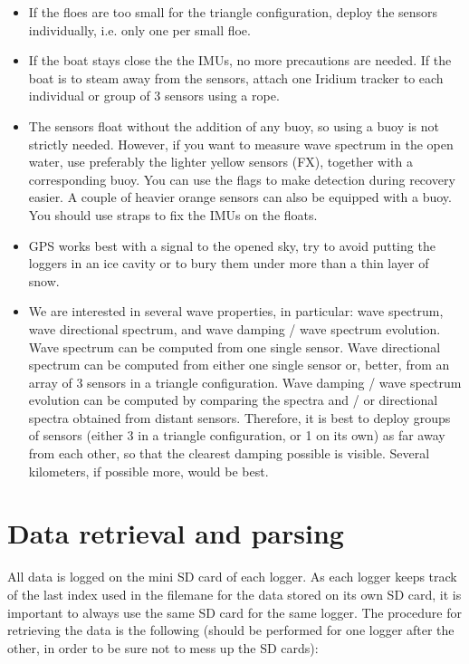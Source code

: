 \documentclass[pdftex,a4paper,12pt,twocolumn,fleqn,captions=tableheading]{scrartcl}
\begin{document}
\begin{itemize}
  \item If the floes are too small for the triangle configuration, deploy the sensors individually, i.e. only one per small floe.

  \item If the boat stays close the the IMUs, no more precautions are needed. If the boat is to steam away from the sensors, attach one Iridium tracker to each individual or group of 3 sensors using a rope.

  \item The sensors float without the addition of any buoy, so using a buoy is not strictly needed. However, if you want to measure wave spectrum in the open water, use preferably the lighter yellow sensors (FX), together with a corresponding buoy. You can use the flags to make detection during recovery easier. A couple of heavier orange sensors can also be equipped with a buoy. You should use straps to fix the IMUs on the floats.

  \item GPS works best with a signal to the opened sky, try to avoid putting the loggers in an ice cavity or to bury them under more than a thin layer of snow.

  \item We are interested in several wave properties, in particular: wave spectrum, wave directional spectrum, and wave damping / wave spectrum evolution. Wave spectrum can be computed from one single sensor. Wave directional spectrum can be computed from either one single sensor or, better, from an array of 3 sensors in a triangle configuration. Wave damping / wave spectrum evolution can be computed by comparing the spectra and / or directional spectra obtained from distant sensors. Therefore, it is best to deploy groups of sensors (either 3 in a triangle configuration, or 1 on its own) as far away from each other, so that the clearest damping possible is visible. Several kilometers, if possible more, would be best.
\end{itemize}

\section{Data retrieval and parsing}

All data is logged on the mini SD card of each logger. As each logger keeps track of the last index used in the filemane for the data stored on its own SD card, it is important to always use the same SD card for the same logger. The procedure for retrieving the data is the following (should be performed for one logger after the other, in order to be sure not to mess up the SD cards):
\end{document}
